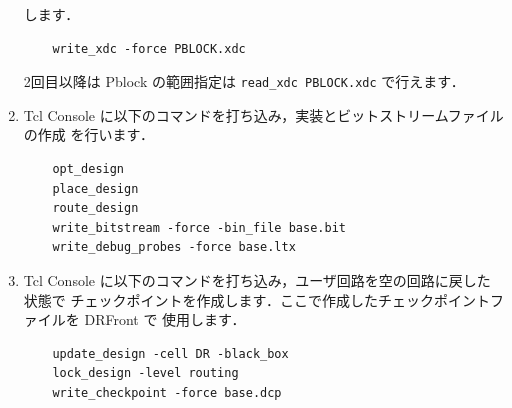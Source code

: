 \begin{enumerate}
 します．
\begin{verbatim}
    write_xdc -force PBLOCK.xdc
\end{verbatim}
 2回目以降は Pblock の範囲指定は \texttt{read\_xdc PBLOCK.xdc} で行えます．
 \item Tcl Console に以下のコマンドを打ち込み，実装とビットストリームファイルの作成
 を行います．
\begin{verbatim}
    opt_design
    place_design
    route_design
    write_bitstream -force -bin_file base.bit
    write_debug_probes -force base.ltx
\end{verbatim}
 \item Tcl Console に以下のコマンドを打ち込み，ユーザ回路を空の回路に戻した状態で
 チェックポイントを作成します．ここで作成したチェックポイントファイルを DRFront で
 使用します．
\begin{verbatim}
    update_design -cell DR -black_box
    lock_design -level routing
    write_checkpoint -force base.dcp
\end{verbatim}
\end{enumerate}

